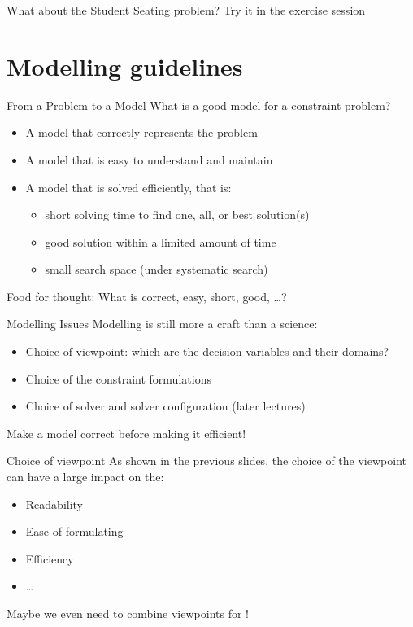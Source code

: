 \documentclass{cons-beamer}
\begin{document}
\begin{frame}{What about the Student Seating problem?}
  \vfill
  \alert{Try it in the exercise session}
  \vfill
\end{frame}


\section{Modelling guidelines}

\begin{frame}{From a Problem to a Model} 
  What is a good model for a constraint problem? \vfill
  \begin{itemize}
    \item A model that \alert{correctly} represents the problem \vfill
    \item A model that is \alert{easy} to understand and maintain \vfill
    \item A model that is solved \alert{efficiently}, that is: \vfill
      \begin{itemize}
        \item \alert{short} solving time to find one, all, or best solution(s) \vfill
        \item \alert{good} solution within a limited amount of time \vfill
        \item \alert{small} search space (under systematic search)
      \end{itemize}
  \end{itemize}\vfill

  Food for thought: What is \alert{correct}, \alert{easy}, \alert{short}, \alert{good}, \dots?
\end{frame}

\begin{frame}{Modelling Issues}
  Modelling is still more a craft than a science: \vfill
  \begin{itemize}
    \item Choice of viewpoint: which are the decision variables and their domains? \vfill
    \item Choice of the constraint formulations \vfill
    \item Choice of solver and solver configuration (later lectures)
  \end{itemize}\vfill

  \alert{Make a model correct before making it efficient!}
\end{frame}

\begin{frame}{Choice of viewpoint}
  As shown in the previous slides, the choice of the viewpoint can have a large impact on the:
  \begin{itemize}
    \item Readability
    \item Ease of formulating
    \item Efficiency
    \item \dots
  \end{itemize}
  \vfill

  Maybe we even need to combine viewpoints for !
\end{frame}
\end{document}

